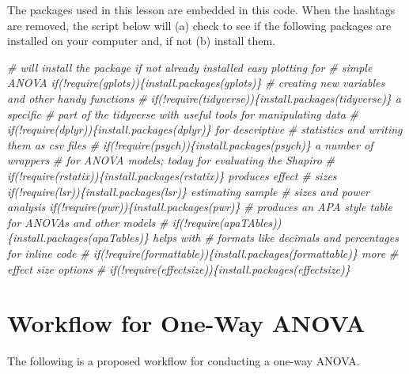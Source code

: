 \documentclass[
  11pt,
]{book}
\newenvironment{Shaded}{\begin{snugshade}}{\end{snugshade}}
\newcommand{\CommentTok}[1]{\textcolor[rgb]{0.56,0.35,0.01}{\textit{#1}}}
\begin{document}
The packages used in this lesson are embedded in this code. When the hashtags are removed, the script below will (a) check to see if the following packages are installed on your computer and, if not (b) install them.

\begin{Shaded}
\begin{Highlighting}[]
\CommentTok{\# will install the package if not already installed easy plotting for}
\CommentTok{\# simple ANOVA if(!require(gplots))\{install.packages(\textquotesingle{}gplots\textquotesingle{})\}}
\CommentTok{\# creating new variables and other handy functions}
\CommentTok{\# if(!require(tidyverse))\{install.packages(\textquotesingle{}tidyverse\textquotesingle{})\} a specific}
\CommentTok{\# part of the tidyverse with useful tools for manipulating data}
\CommentTok{\# if(!require(dplyr))\{install.packages(\textquotesingle{}dplyr\textquotesingle{})\} for descriptive}
\CommentTok{\# statistics and writing them as csv files}
\CommentTok{\# if(!require(psych))\{install.packages(\textquotesingle{}psych\textquotesingle{})\} a number of wrappers}
\CommentTok{\# for ANOVA models; today for evaluating the Shapiro}
\CommentTok{\# if(!require(rstatix))\{install.packages(\textquotesingle{}rstatix\textquotesingle{})\} produces effect}
\CommentTok{\# sizes if(!require(lsr))\{install.packages(\textquotesingle{}lsr\textquotesingle{})\} estimating sample}
\CommentTok{\# sizes and power analysis if(!require(pwr))\{install.packages(\textquotesingle{}pwr\textquotesingle{})\}}
\CommentTok{\# produces an APA style table for ANOVAs and other models}
\CommentTok{\# if(!require(apaTAbles))\{install.packages(\textquotesingle{}apaTables\textquotesingle{})\} helps with}
\CommentTok{\# formats like decimals and percentages for inline code}
\CommentTok{\# if(!require(formattable))\{install.packages(\textquotesingle{}formattable\textquotesingle{})\} more}
\CommentTok{\# effect size options}
\CommentTok{\# if(!require(effectsize))\{install.packages(\textquotesingle{}effectsize\textquotesingle{})\}}
\end{Highlighting}
\end{Shaded}

\hypertarget{workflow-for-one-way-anova}{%
\section{Workflow for One-Way ANOVA}\label{workflow-for-one-way-anova}}

The following is a proposed workflow for conducting a one-way ANOVA.
\end{document}
